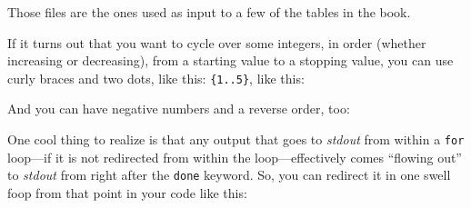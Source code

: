 \documentclass[]{krantz}
\makeatletter
\newenvironment{Shaded}{\begin{snugshade}}{\end{snugshade}}
\newcommand{\BuiltInTok}[1]{#1}
\newcommand{\CommentTok}[1]{\textcolor[rgb]{0.37,0.37,0.37}{\textit{#1}}}
\newcommand{\DataTypeTok}[1]{\textcolor[rgb]{0.27,0.27,0.27}{#1}}
\newcommand{\ExtensionTok}[1]{#1}
\newcommand{\FunctionTok}[1]{\textcolor[rgb]{0,0,0}{#1}}
\newcommand{\KeywordTok}[1]{\textcolor[rgb]{0.27,0.27,0.27}{\textbf{#1}}}
\newcommand{\NormalTok}[1]{#1}
\newcommand{\OperatorTok}[1]{\textcolor[rgb]{0.43,0.43,0.43}{\textbf{#1}}}
\newcommand{\StringTok}[1]{\textcolor[rgb]{0.5,0.5,0.5}{#1}}
\newcommand{\VariableTok}[1]{\textcolor[rgb]{0,0,0}{#1}}
\newenvironment{kframe}{%
\medskip{}
\setlength{\fboxsep}{.8em}
 \def\at@end@of@kframe{}%
 \ifinner\ifhmode%
  \def\at@end@of@kframe{\end{minipage}}%
  \begin{minipage}{\columnwidth}%
 \fi\fi%
 \def\FrameCommand##1{\hskip\@totalleftmargin \hskip-\fboxsep
 \colorbox{shadecolor}{##1}\hskip-\fboxsep
     \hskip-\linewidth \hskip-\@totalleftmargin \hskip\columnwidth}%
 \MakeFramed {\advance\hsize-\width
   \@totalleftmargin\z@ \linewidth\hsize
   \@setminipage}}%
 {\par\unskip\endMakeFramed%
 \at@end@of@kframe}
\renewenvironment{Shaded}{\begin{kframe}}{\end{kframe}}
\makeatother
\begin{document}
Those files are the ones used as input to a few of the tables
in the book.

If it turns out that you want to cycle over some integers,
in order (whether increasing or decreasing), from a starting
value to a stopping value, you can use curly braces and two dots,
like this: \texttt{\{1..5\}}, like this:

\begin{Shaded}
\end{Shaded}

And you can have negative numbers and a reverse order, too:

\begin{Shaded}
\end{Shaded}

One cool thing to realize is that any output that goes to \emph{stdout}
from within a \texttt{for} loop---if it is not redirected from within the
loop---effectively comes ``flowing out'' to \emph{stdout} from right
after the \texttt{done} keyword. So, you can redirect it in one swell foop
from that point in your code like this:

\begin{Shaded}
\end{Shaded}
\end{document}
